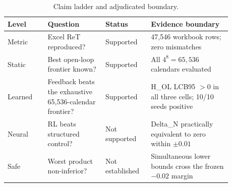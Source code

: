 \begin{table}[htbp]
\centering
\small
\caption{Claim ladder and adjudicated boundary.}
\label{tab:claim_ladder}
\begin{tabular}{p{0.16\linewidth}p{0.23\linewidth}p{0.17\linewidth}p{0.32\linewidth}}
\toprule
Level & Question & Status & Evidence boundary \\
\midrule
Metric & Excel ReT reproduced? & Supported & 47,546 workbook rows; zero mismatches \\
Static & Best open-loop frontier known? & Supported & All $4^8=65,536$ calendars evaluated \\
Learned & Feedback beats the exhaustive 65,536-calendar frontier? & Supported & H\_OL LCB95 $>0$ in all three cells; 10/10 seeds positive \\
Neural & RL beats structured control? & Not supported & Delta\_N practically equivalent to zero within $\pm0.01$ \\
Safe & Worst product non-inferior? & Not established & Simultaneous lower bounds cross the frozen $-0.02$ margin \\
\bottomrule
\end{tabular}
\end{table}
